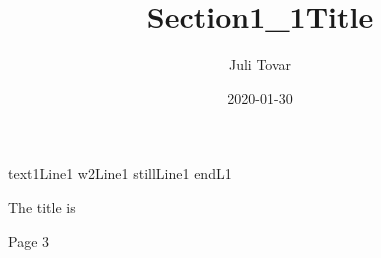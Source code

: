 \documentclass{article}
\title{Section1\_1Title}
\date{2020-01-30}
\author{Juli Tovar}
\makeatletter
\let\newti\@title
\makeatother
\begin{document}
  text1Line1 w2Line1
  stillLine1 endL1

  \maketitle

  The title is \newti


  \newpage
  Page 3

\end{document}
